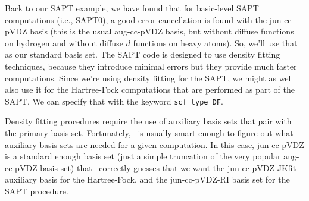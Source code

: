 Back to our SAPT example, we have found that for basic-level SAPT
computations (i.e., SAPT0), a good error cancellation is found
\cite{Hohenstein:2012:WIREs} with the jun-cc-pVDZ basis (this is the
usual aug-cc-pVDZ basis, but without diffuse functions on hydrogen and
without diffuse $d$ functions on heavy atoms).\cite{Papajak:2011:10} So,
we'll use that as our standard basis set.  The SAPT code is designed to
use density fitting techniques, because they introduce minimal errors
but they provide much faster computations.\cite{Hohenstein:2010:184111,
Hohenstein:2010:014101} Since we're using density fitting for the SAPT,
we might as well also use it for the Hartree-Fock computations that are
performed as part of the SAPT.  We can specify that with the keyword
{\tt scf\_type DF}.

Density fitting procedures require the use of auxiliary basis sets that
pair with the primary basis set.  Fortunately, \PSIfour\ is usually smart
enough to figure out what auxiliary basis sets are needed for a given
computation.  In this case, jun-cc-pVDZ is a standard enough basis set
(just a simple truncation of the very popular aug-cc-pVDZ basis set)
that \PSIfour\ correctly guesses that we want the jun-cc-pVDZ-JKfit
auxiliary basis for the Hartree-Fock, and the jun-cc-pVDZ-RI basis set
for the SAPT procedure.

